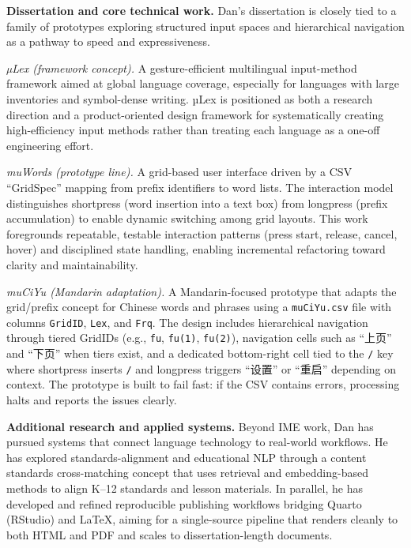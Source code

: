 \UTCOneSingleBlank

\textbf{Dissertation and core technical work.}
Dan’s dissertation is closely tied to a family of prototypes exploring structured input spaces and hierarchical navigation as a pathway to speed and expressiveness.

\UTCOneSingleBlank

\textit{µLex (framework concept).}
A gesture-efficient multilingual input-method framework aimed at global language coverage, especially for languages with large inventories and symbol-dense writing. µLex is positioned as both a research direction and a product-oriented design framework for systematically creating high-efficiency input methods rather than treating each language as a one-off engineering effort.

\UTCOneSingleBlank

\textit{muWords (prototype line).}
A grid-based user interface driven by a CSV ``GridSpec'' mapping from prefix identifiers to word lists. The interaction model distinguishes shortpress (word insertion into a text box) from longpress (prefix accumulation) to enable dynamic switching among grid layouts. This work foregrounds repeatable, testable interaction patterns (press start, release, cancel, hover) and disciplined state handling, enabling incremental refactoring toward clarity and maintainability.

\UTCOneSingleBlank

\textit{muCiYu (Mandarin adaptation).}
A Mandarin-focused prototype that adapts the grid/prefix concept for Chinese words and phrases using a \texttt{muCiYu.csv} file with columns \texttt{GridID}, \texttt{Lex}, and \texttt{Frq}. The design includes hierarchical navigation through tiered GridIDs (e.g., \texttt{fu}, \texttt{fu(1)}, \texttt{fu(2)}), navigation cells such as ``上页'' and ``下页'' when tiers exist, and a dedicated bottom-right cell tied to the \texttt{/} key where shortpress inserts \texttt{/} and longpress triggers ``设置'' or ``重启'' depending on context. The prototype is built to fail fast: if the CSV contains errors, processing halts and reports the issues clearly.

\UTCOneSingleBlank

\textbf{Additional research and applied systems.}
Beyond IME work, Dan has pursued systems that connect language technology to real-world workflows. He has explored standards-alignment and educational NLP through a content standards cross-matching concept that uses retrieval and embedding-based methods to align K--12 standards and lesson materials. In parallel, he has developed and refined reproducible publishing workflows bridging Quarto (RStudio) and \LaTeX{}, aiming for a single-source pipeline that renders cleanly to both HTML and PDF and scales to dissertation-length documents.

